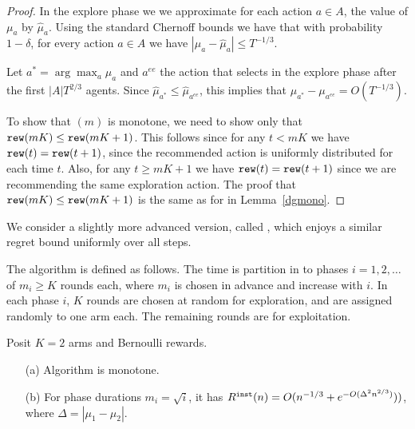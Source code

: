\begin{proof}
In the explore phase we we approximate for each action $a\in A$, the
value of $\mu_a$ by $\hat{\mu}_a$. Using the standard Chernoff
bounds we have that with probability $1-\delta$, for every action
$a\in A$ we have $|\mu_a -\hat{\mu}_a| \leq T^{-1/3}$.

Let $a^* = \arg\max_a \mu_a$ and $a^{ee}$ the action that
\ExplorExploit selects in the explore phase after the first
$|A|T^{2/3}$ agents. Since $\hat{\mu}_{a^*} \leq
\hat{\mu}_{a^{ee}}$, this implies that $\mu_{a^*} -
\mu_{a^{ee}}=O(T^{-1/3})$.

To show that \ExplorExploit$(m)$ is monotone, we need to show only
that $\mathtt{rew}(mK) \leq \mathtt{rew}(mK+1)$. This follows since for any $t< mK$
we have $\mathtt{rew}(t)=\mathtt{rew}(t+1)$, since the recommended action is
uniformly distributed for each time $t$. Also, for any $t\geq mK+1$
we have $\mathtt{rew}(t)=\mathtt{rew}(t+1)$ since we are recommending the same
exploration action. The proof that $\mathtt{rew}(mK) \leq \mathtt{rew}(mK+1)$ is the
same as for \DynGreedy in Lemma~\ref{dgmono}.
\end{proof}

We consider a slightly more advanced version, called \PhasedExplorExploit, which enjoys a similar regret bound uniformly over all steps.

The algorithm is defined as follows. The time is partition in to phases $i = 1,2, \ldots $ of $m_i\geq K$ rounds each, where $m_i$ is chosen in advance and increase with $i$. In each phase $i$, $K$ rounds are chosen at random for exploration, and are assigned randomly to one arm each. The remaining rounds are for exploitation. 

\begin{lemma}
Posit $K=2$ arms and Bernoulli rewards. 
\begin{itemize}
\item[(a)] Algorithm \PhasedExplorExploit is monotone.

\item[(b)] For phase durations $m_i =\sqrt{i}$, it has 
    $R^{\mathtt{inst}}(n)=O(n^{-1/3}+e^{-O(\Delta^2 n^{2/3})}))$,
where $\Delta = |\mu_1-\mu_2|$.
\end{itemize}
\end{lemma}

